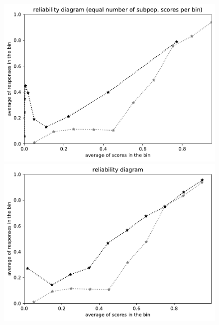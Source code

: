 \documentclass{article}
\newlength{\vertsep}
\newlength{\imsize}
\begin{document}
\begin{figure}
\begin{centering}
\parbox{\imsize}{\includegraphics[width=\imsize]
{../codes/unweighted/10000_7000_10_1/equisamps.pdf}}
\quad\quad
\parbox{\imsize}{\includegraphics[width=\imsize]
{../codes/unweighted/10000_7000_10_1/equiscore.pdf}}

\vspace{\vertsep}


\end{centering}
\end{figure}
\end{document}
